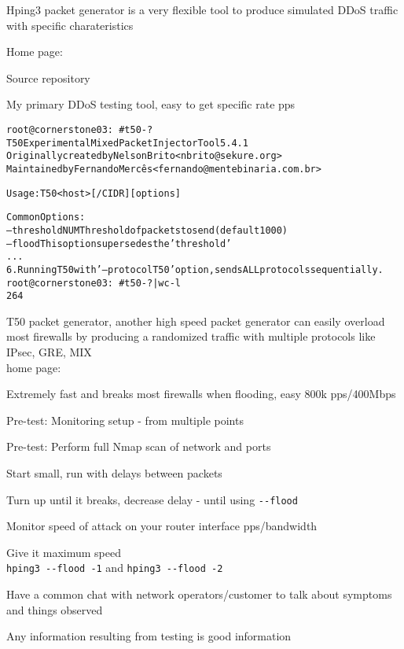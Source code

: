 \documentclass[Screen16to9,17pt]{foils}
\begin{document}
\begin{list2}
\item Hping3 packet generator is a very flexible tool to produce simulated DDoS traffic with specific charateristics
\item Home page: 
\item Source repository 
\end{list2}

\centerline{My primary DDoS testing tool, easy to get specific rate pps}



\begin{alltt}\footnotesize
root@cornerstone03:~# t50 -?
T50 Experimental Mixed Packet Injector Tool 5.4.1
Originally created by Nelson Brito <nbrito@sekure.org>
Maintained by Fernando Mercês <fernando@mentebinaria.com.br>

Usage: T50 <host> [/CIDR] [options]

Common Options:
    --threshold NUM        Threshold of packets to send     (default 1000)
    --flood                This option supersedes the 'threshold'
...
6. Running T50 with '--protocol T50' option, sends ALL protocols sequentially.
root@cornerstone03:~# t50 -? | wc -l
264
\end{alltt}

\begin{list2}
\item T50 packet generator, another high speed packet generator
can easily overload most firewalls by producing a randomized traffic with multiple protocols like IPsec, GRE, MIX \\
home page: 
\end{list2}

\centerline{Extremely fast and breaks most firewalls when flooding, easy 800k pps/400Mbps}


\begin{list2}
\item Pre-test: Monitoring setup - from multiple points
\item Pre-test: Perform full Nmap scan of network and ports
\item Start small, run with delays between packets
\item Turn up until it breaks, decrease delay - until using \verb+--flood+
\item Monitor speed of attack on your router interface pps/bandwidth
\item Give it maximum speed\\
 \verb+hping3 --flood -1+ and \verb+hping3 --flood -2+
\item Have a common chat with network operators/customer to talk about symptoms and things observed
\item Any information resulting from testing is good information
\end{list2}
\end{document}
